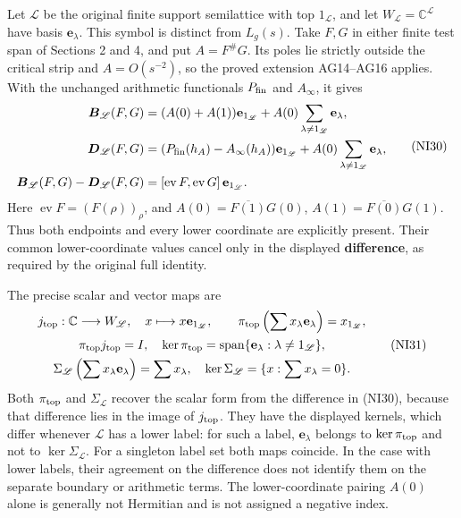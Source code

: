 \documentclass[
  10pt,
  a4paper,
]{article}
\begin{document}
Let \(\mathscr L\) be the original finite support semilattice with top
\(1_{\mathscr L}\), and let \(W_{\mathscr L}=\mathbb C^{\mathscr L}\)
have basis \(\mathbf e_\lambda\). This symbol is distinct from
\(L_g(s)\). Take \(F,G\) in either finite test span of Sections 2 and 4,
and put \(A=F^\#G\). Its poles lie strictly outside the critical strip
and \(A=O(s^{-2})\), so the proved extension AG14--AG16 applies. With
the unchanged arithmetic functionals \(P_{\rm fin}\) and \(A_\infty\),
it gives \[
\begin{aligned}
\boldsymbol B_{\mathscr L}(F,G)
&=(A(0)+A(1))\mathbf e_{1_{\mathscr L}}
+A(0)\sum_{\lambda\ne1_{\mathscr L}}\mathbf e_\lambda,\\
\boldsymbol D_{\mathscr L}(F,G)
&=(P_{\rm fin}(h_A)-A_\infty(h_A))\mathbf e_{1_{\mathscr L}}
+A(0)\sum_{\lambda\ne1_{\mathscr L}}\mathbf e_\lambda,\\
\boldsymbol B_{\mathscr L}(F,G)-\boldsymbol D_{\mathscr L}(F,G)
&=[\operatorname{ev}F,\operatorname{ev}G]\,\mathbf e_{1_{\mathscr L}}.
\end{aligned}
\tag{NI30}
\] Here \(\operatorname{ev}F=(F(\rho))_\rho\), and
\(A(0)=\overline{F(1)}G(0)\), \(A(1)=\overline{F(0)}G(1)\). Thus both
endpoints and every lower coordinate are explicitly present. Their
common lower-coordinate values cancel only in the displayed
\textbf{difference}, as required by the original full identity.

The precise scalar and vector maps are \[
\begin{gathered}
j_{\rm top}:\mathbb C\longrightarrow W_{\mathscr L},\quad
x\longmapsto x\mathbf e_{1_{\mathscr L}},\qquad
\pi_{\rm top}\left(\sum x_\lambda\mathbf e_\lambda\right)=x_{1_{\mathscr L}},\\
\pi_{\rm top}j_{\rm top}=I,\quad
\ker\pi_{\rm top}=\operatorname{span}\{\mathbf e_\lambda:\lambda\ne1_{\mathscr L}\},\\
\Sigma_{\mathscr L}\left(\sum x_\lambda\mathbf e_\lambda\right)=\sum x_\lambda,
\quad \ker\Sigma_{\mathscr L}=\{x:\sum x_\lambda=0\}.
\end{gathered}
\tag{NI31}
\] Both \(\pi_{\rm top}\) and \(\Sigma_{\mathscr L}\) recover the scalar
form from the difference in (NI30), because that difference lies in the
image of \(j_{\rm top}\). They have the displayed kernels, which differ
whenever \(\mathscr L\) has a lower label: for such a label,
\(\mathbf e_\lambda\) belongs to \(\ker\pi_{\rm top}\) and not to
\(\ker\Sigma_{\mathscr L}\). For a singleton label set both maps
coincide. In the case with lower labels, their agreement on the
difference does not identify them on the separate boundary or arithmetic
terms. The lower-coordinate pairing \(A(0)\) alone is generally not
Hermitian and is not assigned a negative index.
\end{document}
